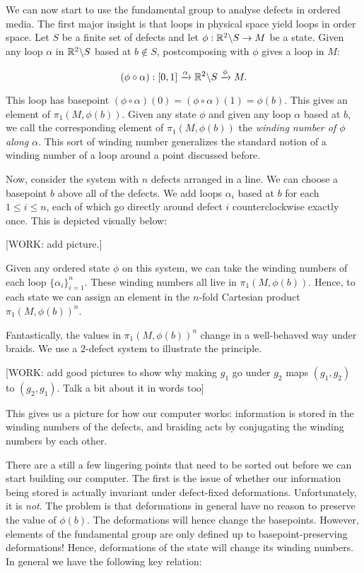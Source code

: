 We can now start to use the fundamental group to analyse defects in ordered media. The first major insight is that loops in physical space yield loops in order space. Let $S$ be a finite set of defects and let $\phi: \mathbb{R}^2 \backslash S \to M$ be a state. Given any loop $\alpha$ in $\mathbb{R}^2\backslash S$ based at $b\not\in S$, postcomposing with $\phi$ gives a loop in $M$:

$$(\phi \circ \alpha): [0,1]\xrightarrow{\alpha} \mathbb{R}^2 \backslash S \xrightarrow{\phi} M.$$

This loop has basepoint $(\phi \circ \alpha)(0)=(\phi\circ \alpha)(1)=\phi(b)$. This gives an element of $\pi_1(M,\phi(b))$. Given any state $\phi$ and given any loop $\alpha$ based at $b$, we call the corresponding element of $\pi_1(M,\phi(b))$ the \textit{winding number of $\phi$ along $\alpha$}. This sort of winding number generalizes the standard notion of a winding number of a loop around a point discussed before.

Now, consider the system with $n$ defects arranged in a line. We can choose a basepoint $b$ above all of the defects. We add loops $\alpha_i$ based at $b$ for each $1\leq i \leq n$, each of which go directly around defect $i$ counterclockwise exactly once. This is depicted visually below:

[WORK: add picture.]

Given any ordered state $\phi$ on this system, we can take the winding numbers of each loop $\{\alpha_i\}_{i=1}^n$. These winding numbers all live in $\pi_1(M,\phi(b))$. Hence, to each state we can assign an element in the $n$-fold Cartesian product $\pi_1(M,\phi(b))^n$.

Fantastically, the values in $\pi_1(M,\phi(b))^n$ change in a well-behaved way under braids. We use a $2$-defect system to illustrate the principle.

[WORK: add good pictures to show why making $g_1$ go under $g_2$ maps $(g_1,g_2)$ to $(g_2,g_1)$. Talk a bit about it in words too]

This gives us a picture for how our computer works: information is stored in the winding numbers of the defects, and braiding acts by conjugating the winding numbers by each other.

There are a still a few lingering points that need to be sorted out before we can start building our computer. The first is the issue of whether our information being stored is actually invariant under defect-fixed deformations. Unfortunately, it is \textit{not}. The problem is that deformations in general have no reason to preserve the value of $\phi(b)$. The deformations will hence change the basepoints. However, elements of the fundamental group are only defined up to basepoint-preserving deformations! Hence, deformations of the state will change its winding numbers. In general we have the following key relation:

